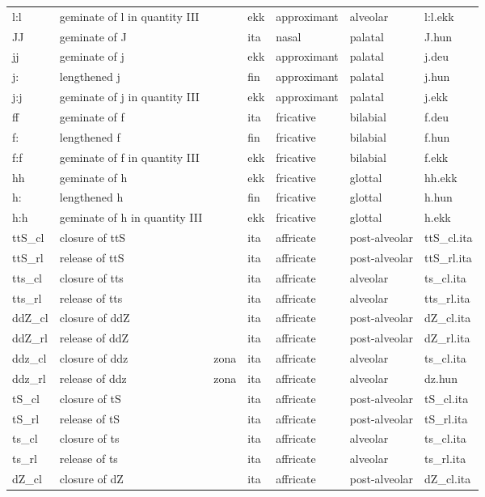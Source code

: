 \begin{longtable}{l|l|l|l|l|l|l}
l:l	& geminate of l in quantity III	& 	& ekk	& approximant	& alveolar	& l:l.ekk\\
JJ	& geminate of J	& 	& ita	& nasal	& palatal	& J.hun\\
jj	& geminate of j	& 	& ekk	& approximant	& palatal	& j.deu\\
j:	& lengthened j	& 	& fin	& approximant	& palatal	& j.hun\\
j:j	& geminate of j in quantity III	& 	& ekk	& approximant	& palatal	& j.ekk\\
ff	& geminate of f	& 	& ita	& fricative	& bilabial	& f.deu\\
f:	& lengthened f	& 	& fin	& fricative	& bilabial	& f.hun\\
f:f	& geminate of f in quantity III	& 	& ekk	& fricative	& bilabial	& f.ekk\\
hh	& geminate of h	& 	& ekk	& fricative	& glottal	& hh.ekk\\
h:	& lengthened h	& 	& fin	& fricative	& glottal	& h.hun\\
h:h	& geminate of h in quantity III	& 	& ekk	& fricative	& glottal	& h.ekk\\
ttS\_cl	& closure of ttS	& 	& ita	& affricate	& post-alveolar	& ttS\_cl.ita\\
ttS\_rl	& release of ttS	& 	& ita	& affricate	& post-alveolar	& ttS\_rl.ita\\
tts\_cl	& closure of tts	& 	& ita	& affricate	& alveolar	& ts\_cl.ita\\
tts\_rl	& release of tts	& 	& ita	& affricate	& alveolar	& tts\_rl.ita\\
ddZ\_cl	& closure of ddZ	& 	& ita	& affricate	& post-alveolar	& dZ\_cl.ita\\
ddZ\_rl	& release of ddZ	& 	& ita	& affricate	& post-alveolar	& dZ\_rl.ita\\
ddz\_cl	& closure of ddz	& zona	& ita	& affricate	& alveolar	& ts\_cl.ita\\
ddz\_rl	& release of ddz	& zona	& ita	& affricate	& alveolar	& dz.hun\\
tS\_cl	& closure of tS	& 	& ita	& affricate	& post-alveolar	& tS\_cl.ita\\
tS\_rl	& release of tS	& 	& ita	& affricate	& post-alveolar	& tS\_rl.ita\\
ts\_cl	& closure of ts	& 	& ita	& affricate	& alveolar	& ts\_cl.ita\\
ts\_rl	& release of ts	& 	& ita	& affricate	& alveolar	& ts\_rl.ita\\
dZ\_cl	& closure of dZ	& 	& ita	& affricate	& post-alveolar	& dZ\_cl.ita\\

\end{longtable}
